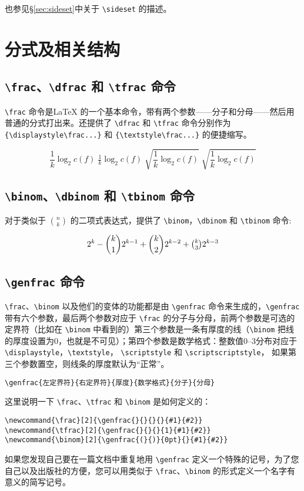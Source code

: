 也参见\S\ref{sec:sideset}中关于 \verb|\sideset| 的描述。
\section{分式及相关结构}
\cprotect\subsection{\verb|\|\verb|frac|、\verb|\|\verb|dfrac| 和 \verb|\|\verb|tfrac| 命令}
\verb|\frac| 命令是\LaTeX{} 的一个基本命令，带有两个参数——分子和分母——然后用普通的分式打出来。还提供了 \verb|\dfrac| 和 \verb|\tfrac| 命令分别作为 \verb|{\displaystyle\frac...}| 和 \verb|{\textstyle\frac...}| 的便捷缩写。
\begin{tcblisting}{}
\begin{equation}
\frac{1}{k}\log_2 c(f)\;\tfrac{1}{k}\log_2 c(f)\;
\sqrt{\frac{1}{k}\log_2 c(f)}\;\sqrt{\dfrac{1}{k}\log_2 c(f)}
\end{equation}
\end{tcblisting}

\cprotect\subsection{\verb|\binom|、\verb|\dbinom| 和 \verb|\tbinom| 命令}
对于类似于 $\binom nk$ 的二项式表达式，提供了 \verb|\binom|，\verb|\dbinom| 和  \verb|\tbinom| 命令:
\begin{tcblisting}{}
\begin{equation}
2^k-\binom{k}{1}2^{k-1}+\dbinom{k}{2}2^{k-2}+\tbinom{k}{3}2^{k-3}
\end{equation}
\end{tcblisting}

\cprotect\subsection{\verb|\genfrac| 命令}
\verb|\frac|、\verb|\binom| 以及他们的变体的功能都是由 \verb|\genfrac| 命令来生成的，\verb|\genfrac| 带有六个参数，最后两个参数对应于 \verb|\frac| 的分子与分母，前两个参数是可选的定界符（比如在 \verb|\binom| 中看到的）第三个参数是一条有厚度的线（\verb|\binom| 把线的厚度设置为0，也就是不可见）；第四个参数是数学格式：整数值0--3分布对应于 \verb|\displaystyle|，\verb|\textstyle|， \verb|\scriptstyle| 和 \verb|\scriptscriptstyle|，  如果第三个参数置空，则线条的厚度默认为“正常”。
\begin{verbatim}
\genfrac{左定界符}{右定界符}{厚度}{数学格式}{分子}{分母}
\end{verbatim}
这里说明一下 \verb|\frac|、\verb|\tfrac| 和 \verb|\binom| 是如何定义的：
\begin{verbatim}
\newcommand{\frac}[2]{\genfrac{}{}{}{}{#1}{#2}}
\newcommand{\tfrac}[2]{\genfrac{}{}{}{1}{#1}{#2}}
\newcommand{\binom}[2]{\genfrac{(}{)}{0pt}{}{#1}{#2}}
\end{verbatim}
如果您发现自己要在一篇文档中重复地用 \verb|\genfrac| 定义一个特殊的记号，为了您自己以及出版社的方便，您可以用类似于 \verb|\frac|、\verb|\binom| 的形式定义一个名字有意义的简写记号。

